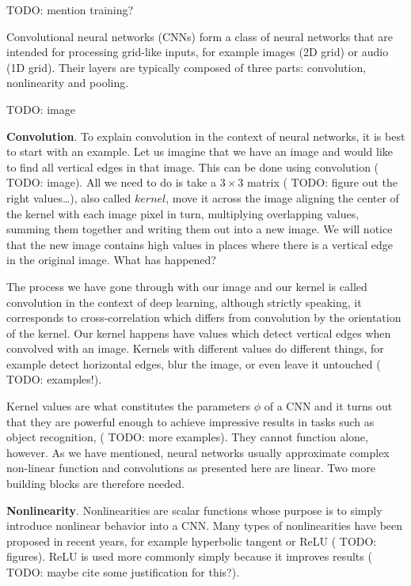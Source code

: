 {\color{red} TODO: mention training?}

Convolutional neural networks (CNNs) form a class of neural networks that are intended for processing grid-like inputs, for example images (2D grid) or audio (1D grid). Their layers are typically composed of three parts: convolution, nonlinearity and pooling.

{\color{red} TODO: image}

\textbf{Convolution}. To explain convolution in the context of neural networks, it is best to start with an example. Let us imagine that we have an image and would like to find all vertical edges in that image. This can be done using convolution ({\color{red} TODO: image}). All we need to do is take a \(3 \times 3\) matrix ({\color{red} TODO: figure out the right values\dots}), also called \(kernel\), move it across the image aligning the center of the kernel with each image pixel in turn, multiplying overlapping values, summing them together and writing them out into a new image. We will notice that the new image contains high values in places where there is a vertical edge in the original image. What has happened?

The process we have gone through with our image and our kernel is called convolution in the context of deep learning, although strictly speaking, it corresponds to cross-correlation which differs from convolution by the orientation of the kernel. Our kernel happens have values which detect vertical edges when convolved with an image. Kernels with different values do different things, for example detect horizontal edges, blur the image, or even leave it untouched ({\color{red} TODO: examples!}).

Kernel values are what constitutes the parameters \(\phi\) of a CNN and it turns out that they are powerful enough to achieve impressive results in tasks such as object recognition, ({\color{red} TODO: more examples}). They cannot function alone, however. As we have mentioned, neural networks usually approximate complex non-linear function and convolutions as presented here are linear. Two more building blocks are therefore needed.

\textbf{Nonlinearity}. Nonlinearities are scalar functions whose purpose is to simply introduce nonlinear behavior into a CNN. Many types of nonlinearities have been proposed in recent years, for example hyperbolic tangent or ReLU ({\color{red} TODO: figures}). ReLU is used more commonly simply because it improves results ({\color{red} TODO: maybe cite some justification for this?}).

